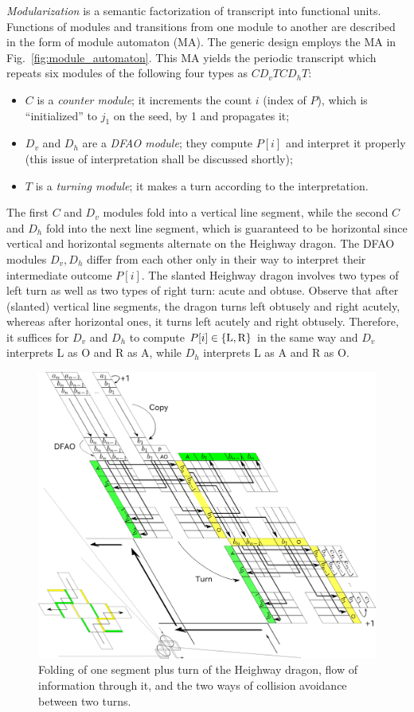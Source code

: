 \documentclass[runningheads]{llncs}
\begin{document}
\textit{Modularization} is a semantic factorization of transcript into functional units. 
Functions of modules and transitions from one module to another are described in the form of module automaton (MA). 
The generic design employs the MA in Fig.~\ref{fig:module_automaton}.
This MA yields the periodic transcript which repeats six modules of the following four types as $C D_v T C D_h T$:
\begin{itemize}
\item $C$ is a \textit{counter module}; it increments the count $i$ (index of $P$), which is ``initialized'' to $j_1$ on the seed, by 1 and propagates it; 
\item $D_v$ and $D_h$ are a \textit{DFAO module}; they compute $P[i]$ and interpret it properly (this issue of interpretation shall be discussed shortly); 
\item $T$ is a \textit{turning module}; it makes a turn according to the interpretation. 
\end{itemize}
The first $C$ and $D_v$ modules fold into a vertical line segment, while the second $C$ and $D_h$ fold into the next line segment, which is guaranteed to be horizontal since vertical and horizontal segments alternate on the Heighway dragon. 
The DFAO modules $D_v, D_h$ differ from each other only in their way to interpret their intermediate outcome $P[i]$. 
The slanted Heighway dragon involves two types of left turn as well as two types of right turn: acute and obtuse. 
Observe that after (slanted) vertical line segments, the dragon turns left obtusely and right acutely, whereas after horizontal ones, it turns left acutely and right obtusely. 
Therefore, it suffices for $D_v$ and $D_h$ to compute $P[i] \in \{{\rm L}, {\rm R}\}$ in the same way and $D_v$ interprets L as O and R as A, while $D_h$ interprets L as A and R as O. 

\begin{figure}[tb]
\centering
\includegraphics[width=0.8\linewidth]{Figs/dragon_vol5.png}
\caption{
Folding of one segment plus turn of the Heighway dragon, flow of information through it, and the two ways of collision avoidance between two turns.
}
\label{fig:abst_dragon}
\end{figure}
\end{document}
